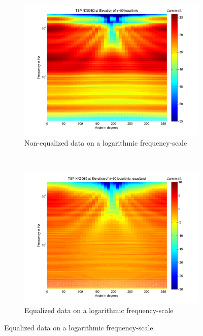 \begin{figure}[t!]
        \begin{subfigure}[t]{0.5\textwidth}
                \centering
			    \caption{Non-equalized data on a logarithmic frequency-scale}
			    \label{fig:before-eq-log}
    			\includegraphics[width=\textwidth]{afbeeldingen/plots/NX506j2_TSP_090_log.png}
        \end{subfigure}~
        \begin{subfigure}[t]{0.5\textwidth}
                \centering
			    \caption{Equalized data on a logarithmic frequency-scale}
			    \label{fig:after-eq-log}
    			\includegraphics[width=\textwidth]{afbeeldingen/plots/NX506j2_TSP_090_log_eq.png}
        \end{subfigure}
\end{figure}